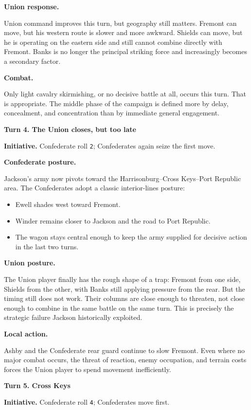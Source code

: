 \documentclass[11pt]{article}
\begin{document}
\textbf{Union response.}

Union command improves this turn, but geography still matters. Fremont can move, but his western route is slower and more awkward. Shields can move, but he is operating on the eastern side and still cannot combine directly with Fremont. Banks is no longer the principal striking force and increasingly becomes a secondary factor.

\textbf{Combat.}

Only light cavalry skirmishing, or no decisive battle at all, occurs this turn. That is appropriate. The middle phase of the campaign is defined more by delay, concealment, and concentration than by immediate general engagement.

\textbf{Turn 4. The Union closes, but too late}

\textbf{Initiative.} Confederate roll \texttt{2}; Confederates again seize the first move.

\textbf{Confederate posture.}

Jackson's army now pivots toward the Harrisonburg--Cross Keys--Port Republic area. The Confederates adopt a classic interior-lines posture:

\begin{itemize}
\item Ewell shades west toward Fremont.
\item Winder remains closer to Jackson and the road to Port Republic.
\item The wagon stays central enough to keep the army supplied for decisive action in the last two turns.
\end{itemize}

\textbf{Union posture.}

The Union player finally has the rough shape of a trap: Fremont from one side, Shields from the other, with Banks still applying pressure from the rear. But the timing still does not work. Their columns are close enough to threaten, not close enough to combine in the same battle on the same turn. This is precisely the strategic failure Jackson historically exploited.

\textbf{Local action.}

Ashby and the Confederate rear guard continue to slow Fremont. Even where no major combat occurs, the threat of reaction, enemy occupation, and terrain costs forces the Union player to spend movement inefficiently.

\textbf{Turn 5. Cross Keys}

\textbf{Initiative.} Confederate roll \texttt{4}; Confederates move first.
\end{document}
